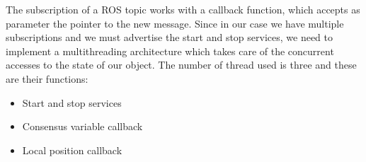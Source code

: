 The subscription of a ROS topic works with a callback function, which accepts as
parameter the pointer to the new message. Since in our case we have multiple subscriptions
and we must advertise the start and stop services, we need to implement a multithreading
architecture which takes care of the concurrent accesses to the state of our object.
The number of thread used is three and these are their functions:
\begin{itemize}
  \item Start and stop services
  \item Consensus variable callback
  \item Local position callback
\end{itemize}






